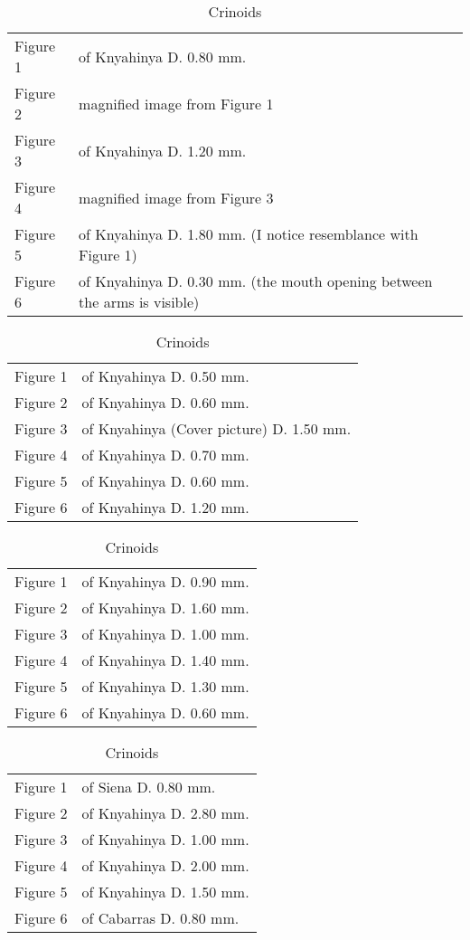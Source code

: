 \documentclass[a4paper, 12pt, oneside]{article}
\begin{document}
\clearpage
\begin{table}[ht!]
\caption{Crinoids}
\centering
\begin{tabular}{ p{2cm} p{10cm} }
\hline
 Figure 1 & of Knyahinya D. 0.80 mm. \\
 Figure 2 & magnified image from Figure 1 \\
 Figure 3 & of Knyahinya D. 1.20 mm. \\
 Figure 4 & magnified image from Figure 3 \\
 Figure 5 & of Knyahinya D. 1.80 mm. (I notice resemblance with Figure 1) \\
 Figure 6 & of Knyahinya D. 0.30 mm. (the mouth opening between the arms is visible)
\end{tabular}
\label{table:21}
\end{table}
\begin{table}[ht!]
\caption{Crinoids}
\centering
\begin{tabular}{ p{2cm} p{10cm} }
\hline
 Figure 1 & of Knyahinya D. 0.50 mm. \\
 Figure 2 & of Knyahinya D. 0.60 mm. \\
 Figure 3 & of Knyahinya (Cover picture) D. 1.50 mm. \\
 Figure 4 & of Knyahinya D. 0.70 mm. \\
 Figure 5 & of Knyahinya D. 0.60 mm. \\
 Figure 6 & of Knyahinya D. 1.20 mm.
\end{tabular}
\label{table:22}
\end{table}
\begin{table}[ht!]
\caption{Crinoids}
\centering
\begin{tabular}{ p{2cm} p{10cm} }
\hline
 Figure 1 & of Knyahinya D. 0.90 mm. \\
 Figure 2 & of Knyahinya D. 1.60 mm. \\
 Figure 3 & of Knyahinya D. 1.00 mm. \\
 Figure 4 & of Knyahinya D. 1.40 mm. \\
 Figure 5 & of Knyahinya D. 1.30 mm. \\
 Figure 6 & of Knyahinya D. 0.60 mm.
\end{tabular}
\label{table:23}
\end{table}
\begin{table}[ht!]
\caption{Crinoids}
\centering
\begin{tabular}{ p{2cm} p{10cm} }
\hline
 Figure 1 & of Siena D. 0.80 mm. \\
 Figure 2 & of Knyahinya D. 2.80 mm. \\
 Figure 3 & of Knyahinya D. 1.00 mm. \\
 Figure 4 & of Knyahinya D. 2.00 mm. \\
 Figure 5 & of Knyahinya D. 1.50 mm. \\
 Figure 6 & of Cabarras D. 0.80 mm.
\end{tabular}
\label{table:24}
\end{table}
\end{document}
